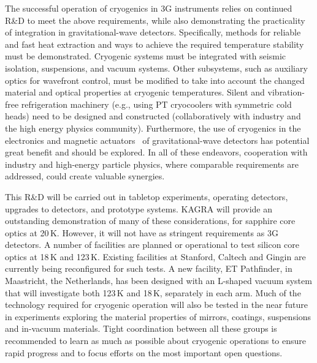 The successful operation of cryogenics in 3G instruments relies on continued R\&D
to meet the above requirements, while also demonstrating the practicality of integration in gravitational-wave detectors. Specifically, methods for reliable and fast heat extraction and ways to achieve the required temperature stability must be demonstrated. Cryogenic systems must be integrated with seismic isolation, suspensions, and vacuum systems.  
Other subsystems, such as auxiliary optics for wavefront control, must be modified to take into account the changed material and optical properties at cryogenic temperatures. Silent and vibration-free refrigeration machinery (e.g., using PT cryocoolers with symmetric cold heads) need to be designed and constructed (collaboratively with industry and the high energy physics community). Furthermore, the use of cryogenics in the electronics and magnetic actuators~\cite{cryo:OSEM} of gravitational-wave detectors has potential great benefit and should be explored. In all of these endeavors, cooperation with industry and high-energy particle physics, where comparable requirements are addressed, could create valuable synergies. 


This R\&D will be carried out in tabletop experiments, operating detectors, upgrades to detectors, and prototype systems. KAGRA will provide an outstanding demonstration of many of these considerations, for sapphire core optics at 20\,K. However, it will not have as stringent requirements as 3G detectors.
A number of facilities are planned or operational to test silicon core optics at 18\,K and 123\,K. 
Existing facilities at Stanford, Caltech and Gingin are currently being reconfigured for such tests. A new facility, ET Pathfinder, in Maastricht, the Netherlands, has been designed with an L-shaped vacuum system that will investigate both 123\,K and  18\,K, separately in each arm. Much of the technology required for cryogenic operation will also be tested in the near future in experiments exploring the material properties of mirrors, coatings, suspensions and in-vacuum materials. Tight coordination between all these groups is recommended to learn as much as possible about cryogenic operations to ensure rapid progress and to focus efforts on the most important open questions.

